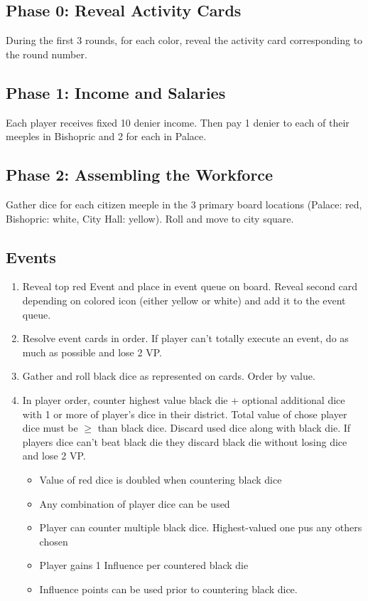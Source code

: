 \documentclass[10pt]{article}
\newenvironment{enumerateCustom}
{\begin{enumerate}
  \setlength{\itemsep}{1pt}
  \setlength{\parskip}{0pt}
  \setlength{\parsep}{0pt}}
{\end{enumerate}}
\newenvironment{itemizeCustom}
{\begin{itemize}
  \setlength{\itemsep}{1pt}
  \setlength{\parskip}{0pt}
  \setlength{\parsep}{0pt}}
{\end{itemize}}
\begin{document}
\begin{multicols*}{2}
    \subsection*{Phase 0: Reveal Activity Cards}
    During the first 3 rounds, for each color, reveal the activity card corresponding to the round number.

    \subsection*{Phase 1: Income and Salaries}
    Each player receives fixed 10 denier income. Then pay 1 denier to each of their meeples in Bishopric and 2 for each in Palace.

    \subsection*{Phase 2: Assembling the Workforce}
    Gather dice for each citizen meeple in the 3 primary board locations (Palace: red, Bishopric: white, City Hall: yellow). Roll and move to city square.

    \subsection*{Events}
    \begin{enumerateCustom}
        \item Reveal top red Event and place in event queue on board. Reveal second card depending on colored icon (either yellow or white) and add it to the event queue.
        \item Resolve event cards in order. If player can't totally execute an event, do as much as possible and lose 2 VP.
        \item Gather and roll black dice as represented on cards. Order by value. 
        \item In player order, counter highest value black die + optional additional dice with 1 or more of player's dice in their district. Total value of chose player dice must be $\ge$ than black dice. Discard used dice along with black die. If players dice can't beat black die they discard black die without losing dice and lose 2 VP.
            \begin{itemizeCustom}
                \item Value of red dice is doubled when countering black dice
                \item Any combination of player dice can be used
                \item Player can counter multiple black dice. Highest-valued one pus any others chosen
                \item Player gains 1 Influence per countered black die
                \item Influence points can be used prior to countering black dice.
            \end{itemizeCustom}
    \end{enumerateCustom}


\end{multicols*}
\end{document}
